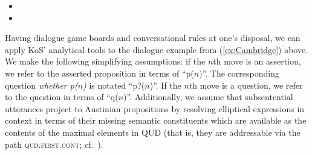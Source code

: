 \documentclass[output=paper
 	        ,biblatex
                ,babelshorthands
                ,newtxmath
                ,draftmode
                ,colorlinks, citecolor=brown
]{langscibook}
\begin{document}
\begin{itemize}
\begin{itemize}
\item
{}
\item
{}
\end{itemize}
\end{itemize}


Having dialogue game boards and conversational rules at one's disposal, we can apply KoS' analytical tools to the dialogue example from (\ref{ex:Cambridge}) above.
%
We make the following simplifying assumptions: if the $n$th move is an assertion, we refer to the asserted proposition in terms of \enquote{p($n$)}. %
The corresponding question \textit{whether p($n$)} is notated \enquote{p?($n$)}.
%
If the $n$th move is a question, we refer to the question in terms of \enquote{q($n$)}.
%
Additionally, we assume that subsentential utterances project to Austinian propositions by resolving elliptical expressions in context in terms of their missing semantic constituents which are available as the contents of the maximal elements in QUD (that is, they are addressable via the path \textsc{qud.first.cont}; cf.\  \citealt[]{Ginzburg:2012}). 
\end{document}
